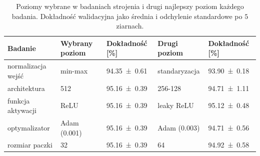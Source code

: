 \begin{table}[H]
    \centering
    \caption{Poziomy wybrane w badaniach strojenia i drugi najlepszy poziom każdego badania. Dokładność walidacyjna jako średnia i odchylenie standardowe po $5$ ziarnach.}
    \label{tab:tuning-summary}
    \begin{tabular}{lllll}
        \toprule
        Badanie & Wybrany poziom & Dokładność [\%] & Drugi poziom & Dokładność [\%] \\
        \midrule
        normalizacja wejść & min-max & \num{94.35 +- 0.61} & standaryzacja & \num{93.90 +- 0.18} \\
        architektura & 512 & \num{95.16 +- 0.39} & 256-128 & \num{94.71 +- 1.11} \\
        funkcja aktywacji & ReLU & \num{95.16 +- 0.39} & leaky ReLU & \num{95.12 +- 0.48} \\
        optymalizator & Adam (\num{0.001}) & \num{95.16 +- 0.39} & Adam (\num{0.003}) & \num{94.71 +- 0.56} \\
        rozmiar paczki & 32 & \num{95.16 +- 0.39} & 64 & \num{94.92 +- 0.58} \\
        \bottomrule
    \end{tabular}
\end{table}

